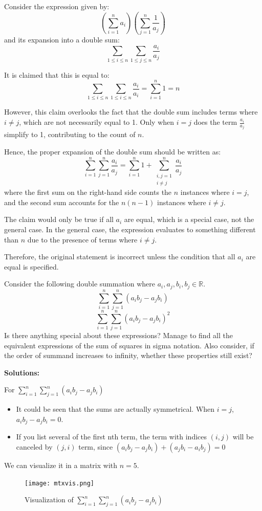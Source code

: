 \documentclass[
	12pt, %
	fleqn, %
	a4paper, %
]{LegrandOrangeBook}
\begin{document}
Consider the expression given by:
\[
\left( \sum_{i=1}^{n} a_i \right) \left( \sum_{j=1}^{n} \frac{1}{a_j} \right)
\]
and its expansion into a double sum:
\[
\sum_{1 \leq i \leq n} \sum_{1 \leq j \leq n} \frac{a_i}{a_j}
\]

It is claimed that this is equal to:
\[
\sum_{1 \leq i \leq n} \sum_{1 \leq i \leq n} \frac{a_i}{a_i} = \sum_{i=1}^{n} 1 = n
\]

However, this claim overlooks the fact that the double sum includes terms where \( i \neq j \), which are not necessarily equal to 1. Only when \( i = j \) does the term \( \frac{a_i}{a_j} \) simplify to 1, contributing to the count of \( n \).

Hence, the proper expansion of the double sum should be written as:
\[
\sum_{i=1}^{n} \sum_{j=1}^{n} \frac{a_i}{a_j} = \sum_{i=1}^{n} 1 + \sum_{\substack{i,j=1 \\ i \neq j}}^{n} \frac{a_i}{a_j}
\]
where the first sum on the right-hand side counts the \( n \) instances where \( i = j \), and the second sum accounts for the \( n(n-1) \) instances where \( i \neq j \).

The claim would only be true if all \( a_i \) are equal, which is a special case, not the general case. In the general case, the expression evaluates to something different than \( n \) due to the presence of terms where \( i \neq j \). 

Therefore, the original statement is incorrect unless the condition that all \( a_i \) are equal is specified.

\begin{exercise}
    Consider the following double summation where $a_i, a_j, b_i, b_j \in \mathbb{R}$.
    $$\sum_{i=1}^{n} \sum_{j=1}^{n} (a_ib_j-a_jb_i)$$
    $$\sum_{i=1}^{n} \sum_{j=1}^{n} (a_ib_j-a_jb_i)^2$$
    Is there anything special about these expressions? Manage to find all the equivalent expressions of
    the sum of squares in sigma notation. Also consider, if the order of summand increases to infinity, 
    whether these properties still exist?
\end{exercise}
\textbf{Solutions:}

For $\sum_{i=1}^{n} \sum_{j=1}^{n} (a_ib_j-a_jb_i)$
\begin{itemize}
    \item It could be seen that the sums are actually symmetrical. When $i=j$, $a_ib_j-a_jb_i=0$.
    \item If you list several of the first nth term, the term with indices $(i, j)$ will be canceled by $(j, i)$ term, since $(a_ib_j-a_jb_i)+(a_jb_i-a_ib_j)=0$ 
\end{itemize} 
We can visualize it in a matrix with $n=5$.
\begin{figure}[H]
    \centering
    \texttt{[image: mtxvis.png]}
    \caption{Visualization of $\sum_{i=1}^{n} \sum_{j=1}^{n} (a_ib_j-a_jb_i)$}
\end{figure}
\end{document}
